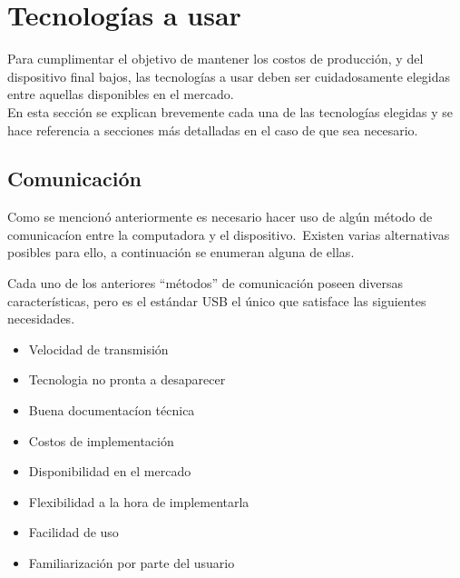 \chapter{Tecnolog\'ias a usar}

Para cumplimentar el objetivo de mantener los costos de producci\'on, y del
dispositivo final bajos, las tecnolog\'ias a usar deben ser cuidadosamente
elegidas entre aquellas disponibles en el mercado.\\ 

En esta secci\'on se explican brevemente cada una de las tecnolog\'ias
elegidas y se hace referencia a secciones m\'as detalladas en el caso de que
sea necesario.

\section{Comunicaci\'on} %

Como se mencion\'o anteriormente es necesario hacer uso de alg\'un m\'etodo de
comunicac\'ion entre la computadora y el dispositivo.\ Existen varias
alternativas posibles para ello, a continuaci\'on se enumeran alguna de ellas.\


Cada uno de los anteriores ``m\'etodos'' de comunicaci\'on poseen diversas
caracter\'isticas, pero es el est\'andar USB el \'unico que satisface las
siguientes necesidades.

\begin{itemize}
  \item Velocidad de transmisi\'on
  \item Tecnologia no pronta a desaparecer
  \item Buena documentac\'ion t\'ecnica
  \item Costos de implementaci\'on
  \item Disponibilidad en el mercado
  \item Flexibilidad a la hora de implementarla
  \item Facilidad de uso
  \item Familiarizaci\'on por parte del usuario
\end{itemize}

